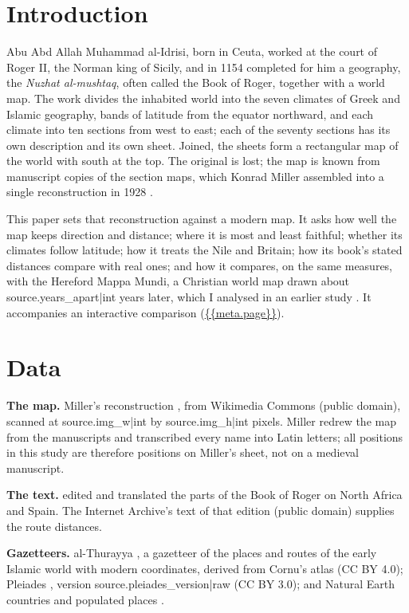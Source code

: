 \documentclass[11pt,a4paper]{article}
\begin{document}
\section{Introduction}
Abu Abd Allah Muhammad al-Idrisi, born in Ceuta, worked at the court of Roger II, the Norman king of Sicily, and in 1154 completed for him a geography, the \textit{Nuzhat al-mushtaq}, often called the Book of Roger, together with a world map. The work divides the inhabited world into the seven climates of Greek and Islamic geography, bands of latitude from the equator northward, and each climate into ten sections from west to east; each of the seventy sections has its own description and its own sheet. Joined, the sheets form a rectangular map of the world with south at the top. The original is lost; the map is known from manuscript copies of the section maps, which Konrad Miller assembled into a single reconstruction in 1928 \citep{miller1928}.

This paper sets that reconstruction against a modern map. It asks how well the map keeps direction and distance; where it is most and least faithful; whether its climates follow latitude; how it treats the Nile and Britain; how its book's stated distances compare with real ones; and how it compares, on the same measures, with the Hereford Mappa Mundi, a Christian world map drawn about {{source.years_apart|int}} years later, which I analysed in an earlier study \citep{hereford}. It accompanies an interactive comparison (\url{{{meta.page}}}).

\section{Data}
\textbf{The map.} Miller's reconstruction \citep{miller1928}, from Wikimedia Commons (public domain), scanned at {{source.img_w|int}} by {{source.img_h|int}} pixels. Miller redrew the map from the manuscripts and transcribed every name into Latin letters; all positions in this study are therefore positions on Miller's sheet, not on a medieval manuscript.

\textbf{The text.} \citet{dozy} edited and translated the parts of the Book of Roger on North Africa and Spain. The Internet Archive's text of that edition (public domain) supplies the route distances.

\textbf{Gazetteers.} al-Thurayya \citep{thurayya}, a gazetteer of the places and routes of the early Islamic world with modern coordinates, derived from Cornu's atlas (CC BY 4.0); Pleiades \citep{pleiades}, version {{source.pleiades_version|raw}} (CC BY 3.0); and Natural Earth countries and populated places \citep{naturalearth}.
\end{document}
